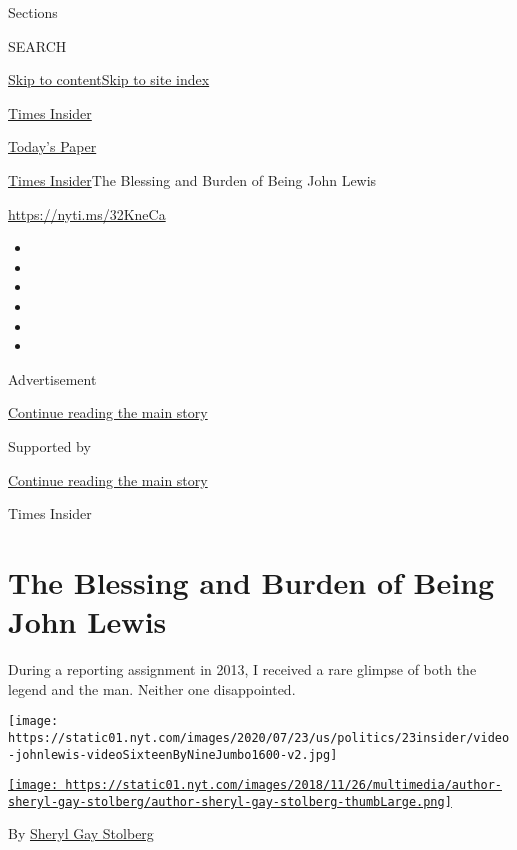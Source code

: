 Sections

SEARCH

\protect\hyperlink{site-content}{Skip to
content}\protect\hyperlink{site-index}{Skip to site index}

\href{https://www.nytimes.com/section/reader-center}{Times Insider}

\href{https://myaccount.nytimes.com/auth/login?response_type=cookie\&client_id=vi}{}

\href{https://www.nytimes.com/section/todayspaper}{Today's Paper}

\href{/section/reader-center}{Times Insider}\textbar{}The Blessing and
Burden of Being John Lewis

\url{https://nyti.ms/32KneCa}

\begin{itemize}
\item
\item
\item
\item
\item
\item
\end{itemize}

Advertisement

\protect\hyperlink{after-top}{Continue reading the main story}

Supported by

\protect\hyperlink{after-sponsor}{Continue reading the main story}

Times Insider

\hypertarget{the-blessing-and-burden-of-being-john-lewis}{%
\section{The Blessing and Burden of Being John
Lewis}\label{the-blessing-and-burden-of-being-john-lewis}}

During a reporting assignment in 2013, I received a rare glimpse of both
the legend and the man. Neither one disappointed.

\texttt{[image: https://static01.nyt.com/images/2020/07/23/us/politics/23insider/video-johnlewis-videoSixteenByNineJumbo1600-v2.jpg]}

\href{https://www.nytimes.com/by/sheryl-gay-stolberg}{\texttt{[image: https://static01.nyt.com/images/2018/11/26/multimedia/author-sheryl-gay-stolberg/author-sheryl-gay-stolberg-thumbLarge.png]}}

By \href{https://www.nytimes.com/by/sheryl-gay-stolberg}{Sheryl Gay
Stolberg}

